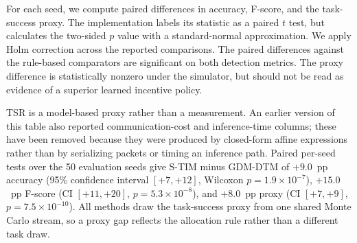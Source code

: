 \documentclass[notspecified,article,submit,moreauthors]{Definitions/mdpi}
\begin{document}
For each seed, we compute paired differences in accuracy, F-score, and the task-success proxy. The implementation labels its statistic as a paired $t$ test, but calculates the two-sided $p$ value with a standard-normal approximation. We apply Holm correction across the reported comparisons. The paired differences against the rule-based comparators are significant on both detection metrics. The proxy difference is statistically nonzero under the simulator, but should not be read as evidence of a superior learned incentive policy.

\begin{table}[!htbp]
  \centering
  \caption{Performance comparison of S-TIM with baseline methods under the unified experimental setting (30\% malicious-node ratio, 15 UAVs, 5000 s simulation). The five rule-based comparators are listed. All values are mean $\pm$ standard deviation over 50 independent trials. Bold marks the proposed model's advantage.}
  \label{tab:baseline_comparison}
  \footnotesize
  \setlength{\tabcolsep}{6pt}
  \renewcommand{\arraystretch}{1.15}
\end{table}

\noindent\footnotesize{TSR is a model-based proxy rather than a measurement. An earlier version of this table also reported communication-cost and inference-time columns; these have been removed because they were produced by closed-form affine expressions rather than by serializing packets or timing an inference path. Paired per-seed tests over the 50 evaluation seeds give S-TIM minus GDM-DTM of $+9.0$~pp accuracy (95\% confidence interval $[+7,+12]$, Wilcoxon $p=1.9\times10^{-7}$), $+15.0$~pp F-score (CI $[+11,+20]$, $p=5.3\times10^{-8}$), and $+8.0$~pp proxy (CI $[+7,+9]$, $p=7.5\times10^{-10}$). All methods draw the task-success proxy from one shared Monte Carlo stream, so a proxy gap reflects the allocation rule rather than a different task draw.}
\normalsize
\end{document}
